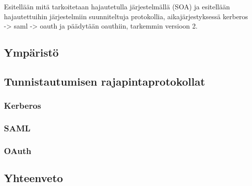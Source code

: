 Esitellään mitä tarkoitetaan hajautetulla järjestelmällä (SOA) ja esitellään hajautettuihin järjestelmiin suunniteltuja protokollia, aikajärjestyksessä  kerberos -> saml -> oauth ja päädytään oauthiin, tarkemmin versioon 2.


\subsection{Ympäristö}

\subsection{Tunnistautumisen rajapintaprotokollat}

\subsubsection{Kerberos}

\subsubsection{SAML}

\subsubsection{OAuth}

\subsection{Yhteenveto}
